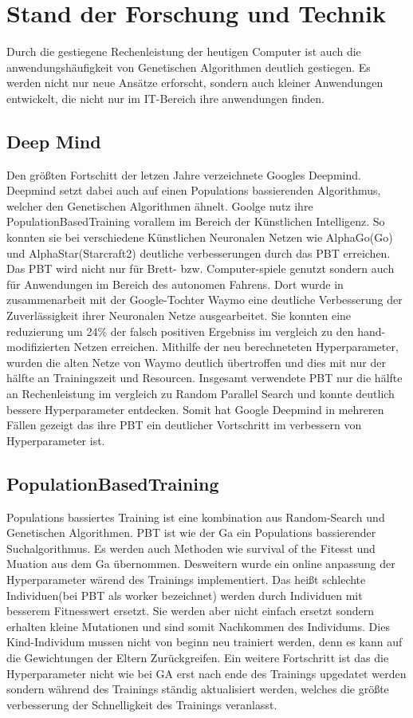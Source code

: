 \section{Stand der Forschung und Technik}
Durch die gestiegene Rechenleistung der heutigen Computer ist auch die anwendungshäufigkeit von Genetischen Algorithmen deutlich gestiegen. Es werden nicht nur neue Ansätze erforscht, sondern auch kleiner Anwendungen entwickelt, die nicht nur im IT-Bereich ihre anwendungen finden.

\subsection{Deep Mind}
Den größten Fortschitt der letzen Jahre verzeichnete Googles Deepmind. Deepmind setzt dabei auch auf einen Populations bassierenden Algorithmus, welcher den Genetischen Algorithmen ähnelt. Goolge nutz ihre PopulationBasedTraining vorallem im Bereich der Künstlichen Intelligenz. So konnten sie bei verschiedene Künstlichen Neuronalen Netzen wie AlphaGo(Go)\cite{alphago} und AlphaStar(Starcraft2)\cite{alphastar} deutliche verbesserungen durch das PBT erreichen. Das PBT wird nicht nur für Brett- bzw. Computer-spiele genutzt sondern auch für Anwendungen im Bereich des autonomen Fahrens. Dort wurde in zusammenarbeit mit der Google-Tochter Waymo eine deutliche Verbesserung der Zuverlässigkeit ihrer Neuronalen Netze ausgearbeitet. Sie konnten eine reduzierung um 24\% der falsch positiven Ergebniss im vergleich zu den hand-modifizierten Netzen erreichen. Mithilfe der neu berechneteten Hyperparameter, wurden die alten Netze von Waymo deutlich übertroffen und dies mit nur der hälfte an Trainingszeit und Resourcen. Insgesamt verwendete PBT nur die hälfte an Rechenleistung im vergleich zu Random Parallel Search und konnte deutlich bessere Hyperparameter entdecken. Somit hat Google Deepmind in mehreren Fällen gezeigt das ihre PBT ein deutlicher Vortschritt im verbessern von Hyperparameter ist.

\subsection{PopulationBasedTraining}
Populations bassiertes Training ist eine kombination aus Random-Search und Genetischen Algorithmen. PBT ist wie der Ga ein Populations bassierender Suchalgorithmus. Es werden auch Methoden wie survival of the Fitesst und Muation aus dem Ga übernommen. Desweitern wurde ein online anpassung der Hyperparameter wärend des Trainings implementiert. Das heißt schlechte Individuen(bei PBT als worker bezeichnet) werden durch Individuen mit besserem Fitnesswert ersetzt. Sie werden aber nicht einfach ersetzt sondern erhalten kleine Mutationen und sind somit Nachkommen des Individums. Dies Kind-Individum mussen nicht von beginn neu trainiert werden, denn es  kann auf die Gewichtungen der Eltern Zurückgreifen. Ein weitere Fortschritt ist das die Hyperparameter nicht wie bei GA erst nach ende des Trainings upgedatet werden sondern während des Trainings ständig aktualisiert werden, welches die größte verbesserung der Schnelligkeit des Trainings veranlasst.



